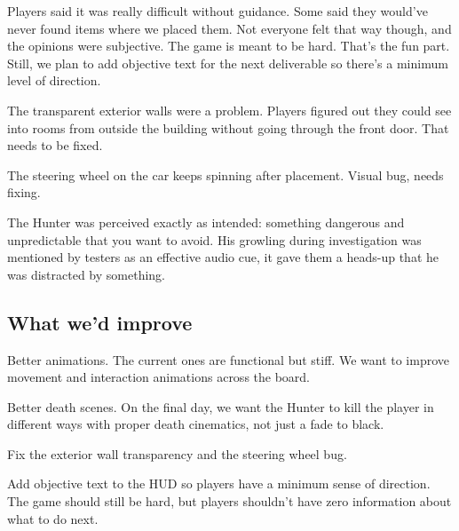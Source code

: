 \documentclass[12pt, a4paper]{article}
\begin{document}
Players said it was really difficult without guidance. Some said they would've never found items where we placed them. Not everyone felt that way though, and the opinions were subjective. The game is meant to be hard. That's the fun part. Still, we plan to add objective text for the next deliverable so there's a minimum level of direction.

The transparent exterior walls were a problem. Players figured out they could see into rooms from outside the building without going through the front door. That needs to be fixed.

The steering wheel on the car keeps spinning after placement. Visual bug, needs fixing.

The Hunter was perceived exactly as intended: something dangerous and unpredictable that you want to avoid. His growling during investigation was mentioned by testers as an effective audio cue, it gave them a heads-up that he was distracted by something.

\subsection{What we'd improve}

Better animations. The current ones are functional but stiff. We want to improve movement and interaction animations across the board.

Better death scenes. On the final day, we want the Hunter to kill the player in different ways with proper death cinematics, not just a fade to black.

Fix the exterior wall transparency and the steering wheel bug.

Add objective text to the HUD so players have a minimum sense of direction. The game should still be hard, but players shouldn't have zero information about what to do next.
\end{document}
